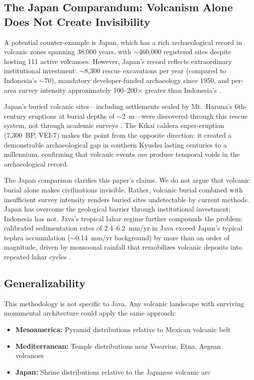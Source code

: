 \documentclass[12pt,a4paper]{article}
\begin{document}
\subsection{The Japan Comparandum: Volcanism Alone Does Not Create Invisibility}

A potential counter-example is Japan, which has a rich archaeological record in volcanic zones spanning 38,000 years, with $\sim$460,000 registered sites despite hosting 111 active volcanoes. However, Japan's record reflects extraordinary institutional investment: $\sim$8,300 rescue excavations per year (compared to Indonesia's $\sim$70), mandatory developer-funded archaeology since 1950, and per-area survey intensity approximately 100--200$\times$ greater than Indonesia's \citep{barnes2003, takata2022}.

Japan's buried volcanic sites---including settlements sealed by Mt.\ Haruna's 6th-century eruptions at burial depths of $\sim$2~m---were discovered through this rescue system, not through academic surveys \citep{shimoyama2002}. The Kikai caldera super-eruption (7,300~BP, VEI-7) makes the point from the opposite direction: it created a demonstrable archaeological gap in southern Kyushu lasting centuries to a millennium, confirming that volcanic events \emph{can} produce temporal voids in the archaeological record.

The Japan comparison clarifies this paper's claims. We do not argue that volcanic burial alone makes civilizations invisible. Rather, volcanic burial combined with insufficient survey intensity renders buried sites undetectable by current methods. Japan has overcome the geological barrier through institutional investment; Indonesia has not. Java's tropical lahar regime further compounds the problem: calibrated sedimentation rates of 2.4--6.2~mm/yr in Java exceed Japan's typical tephra accumulation ($\sim$0.14~mm/yr background) by more than an order of magnitude, driven by monsoonal rainfall that remobilizes volcanic deposits into repeated lahar cycles \citep{lavigne2003}.

\subsection{Generalizability}

This methodology is not specific to Java. Any volcanic landscape with surviving monumental architecture could apply the same approach:
\begin{itemize}
    \item \textbf{Mesoamerica:} Pyramid distributions relative to Mexican volcanic belt
    \item \textbf{Mediterranean:} Temple distributions near Vesuvius, Etna, Aegean volcanoes
    \item \textbf{Japan:} Shrine distributions relative to the Japanese volcanic arc
\end{itemize}
\end{document}
